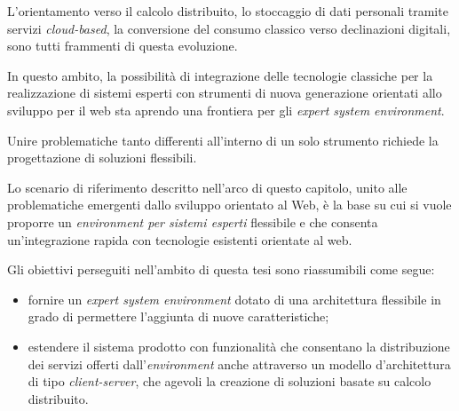 L'orientamento verso il calcolo distribuito, lo stoccaggio di dati personali tramite servizi \emph{cloud-based}, la conversione del consumo classico verso declinazioni digitali, sono tutti frammenti di questa evoluzione.

In questo ambito, la possibilità di integrazione delle tecnologie classiche per la realizzazione di sistemi esperti con strumenti di nuova generazione orientati allo sviluppo per il web sta aprendo una frontiera per gli \emph{expert system environment}.

Unire problematiche tanto differenti all'interno di un solo strumento richiede la progettazione di soluzioni flessibili.


Lo scenario di riferimento descritto nell'arco di questo capitolo, unito alle problematiche emergenti dallo sviluppo orientato al Web, è la base su cui si vuole proporre un \emph{environment per sistemi esperti} flessibile e che consenta un'integrazione rapida con tecnologie esistenti orientate al web.

Gli obiettivi perseguiti nell'ambito di questa tesi sono riassumibili come segue:
\begin{itemize}
	\item fornire un \emph{expert system environment} dotato di una architettura flessibile in grado di permettere l'aggiunta di nuove caratteristiche;
	\item estendere il sistema prodotto con funzionalità che consentano la distribuzione dei servizi offerti dall'\emph{environment} anche attraverso un modello d'architettura di tipo \emph{client-server}, che agevoli la creazione di soluzioni basate su calcolo distribuito.
\end{itemize}



